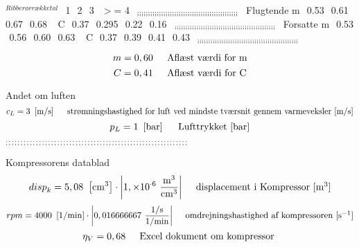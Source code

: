 \documentclass[../Hovedrapport.tex]{subfiles}
\newcommand{\V}[1]{\mbox{$ #1 $}}
\newcommand{\I}{\mbox{\hspace{0.20in}}}
\begin{document}
\vspace{0.10in}
\noindent
\rm $^{Ribberørrækketal}$  $^{}$      1     $^{}$      2     $^{}$      3     $^{}$   $>$= 4  $^{}$\newline
	$_{;;;;;;;;;;;;;;;;;;;;;;;;;;;;;;;;;;;;;;;;;;;;;;\newline}$
	$^{}$ Flugtende     m    $^{}$   0.53   $^{}$   0.61    $^{}$   0.67   $^{}$   0.68   $^{}$\newline
	$^{}$                     C    $^{}$   0.37  $^{}$   0.295   $^{}$   0.22   $^{}$   0.16   $^{}$\newline
	$_{;;;;;;;;;;;;;;;;;;;;;;;;;;;;;;;;;;;;;;;;;;;;;;\newline}$
	$^{}$ Forsatte        m   $^{}$   0.53   $^{}$   0.56    $^{}$   0.60   $^{}$   0.63   $^{}$\newline
     $^{}$                      C   $^{}$   0.37   $^{}$   0.39    $^{}$   0.41   $^{}$   0.43   $^{}$\newline
	$_{;;;;;;;;;;;;;;;;;;;;;;;;;;;;;;;;;;;;;;;;;;;;;;\newline}$

\begin{equation}
\label{EES Eqn:25}
m = 0,60		 
\mbox{\I Aflæst værdi for m}
\end{equation}
\begin{equation}
\label{EES Eqn:26}
C = 0,41	 
\mbox{\I Aflæst værdi for C}
\end{equation}

\vspace{0.10in}
\noindent
\rm Andet om luften
\begin{equation}
\label{EES Eqn:27}
c_{L} = 3   \   \left[ \rm m/s \right]	 
\mbox{\I strømningshastighed for luft ved mindste tværsnit gennem varmeveksler [m/s]}
\end{equation}
\begin{equation}
\label{EES Eqn:28}
p_{L} = 1   \   \left[ \rm bar \right] 	 
\mbox{\I Lufttrykket [bar]}
\end{equation}

\vspace{0.10in}
\noindent
\rm $_{;;;;;;;;;;;;;;;;;;;;;;;;;;;;;;;;;;;;;;;;;;;;;;;;;;;;;;;;;;;;}$

\vspace{0.10in}
\noindent
\rm Kompressorens datablad
\begin{equation}
\label{EES Eqn:29}
\V{disp} _{k} = 5,08   \   \left[ \rm cm^{3} \right] \cdot  \rm { \left|1,\times 10^{ \cdot 6}\ \frac {\rm{m^{3}}}{\rm{cm^{3}}}\right|}	 
\mbox{\I displacement i Kompressor [m$^{3}$]}
\end{equation}
\begin{equation}
\label{EES Eqn:30}
\V{rpm}  = 4000   \   \left[ \rm 1/min \right] \cdot  \rm { \left|0,016666667\ \frac {\rm{1/s}}{\rm{1/min}}\right|}	 
\mbox{\I omdrejningshastighed af kompressoren [s$^{-1}$]}
\end{equation}
\begin{equation}
\label{EES Eqn:31}
\eta_{V} = 0,68	 		 
\mbox{\I Excel dokument om kompressor }
\end{equation}
\end{document}
